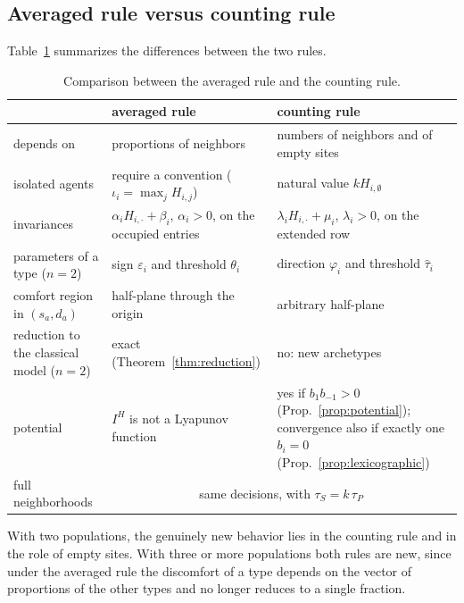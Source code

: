 \documentclass{article}
\theoremstyle{remark}
\begin{document}
\subsection{Averaged rule versus counting rule}

Table~\ref{tab:comparison} summarizes the differences between the two rules.

\begin{table}[h!]
\centering
\begin{tabular}{|p{3.6cm}|p{5cm}|p{5cm}|}
\hline
 & averaged rule & counting rule \\
\hline
depends on & proportions of neighbors & numbers of neighbors and of empty sites \\
\hline
isolated agents & require a convention ($\iota_i=\max_j H_{i,j}$) & natural value $kH_{i,\emptyset}$ \\
\hline
invariances & $\alpha_i H_{i,\cdot}+\beta_i$, $\alpha_i>0$, on the occupied entries & $\lambda_i H_{i,\cdot}+\mu_i$, $\lambda_i>0$, on the extended row \\
\hline
parameters of a type ($n=2$) & sign $\varepsilon_i$ and threshold $\theta_i$ & direction $\varphi_i$ and threshold $\hat\tau_i$ \\
\hline
comfort region in $(s_a,d_a)$ & half-plane through the origin & arbitrary half-plane \\
\hline
reduction to the classical model ($n=2$) & exact (Theorem~\ref{thm:reduction}) & no: new archetypes \\
\hline
potential & $I^H$ is not a Lyapunov function & yes if $b_1b_{-1}>0$ (Prop.~\ref{prop:potential}); convergence also if exactly one $b_i=0$ (Prop.~\ref{prop:lexicographic}) \\
\hline
full neighborhoods & \multicolumn{2}{c|}{same decisions, with $\tau_S=k\,\tau_P$} \\
\hline
\end{tabular}
\caption{Comparison between the averaged rule and the counting rule.}
\label{tab:comparison}
\end{table}

With two populations, the genuinely new behavior lies in the counting rule and in the role of empty sites. With three or more populations both rules are new, since under the averaged rule the discomfort of a type depends on the vector of proportions of the other types and no longer reduces to a single fraction.

\newpage

%

\end{document}
